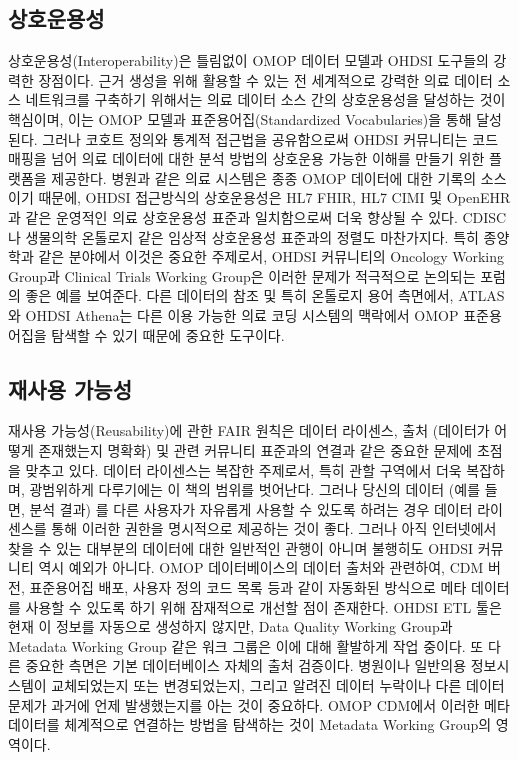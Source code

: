 \documentclass[11pt]{book}
\theoremstyle{definition}
\theoremstyle{definition}
\theoremstyle{definition}
\theoremstyle{remark}
\begin{document}
\subsection{상호운용성}

상호운용성(Interoperability)은 틀림없이 OMOP 데이터 모델과 OHDSI
도구들의 강력한 장점이다. 근거 생성을 위해 활용할 수 있는 전 세계적으로
강력한 의료 데이터 소스 네트워크를 구축하기 위해서는 의료 데이터 소스
간의 상호운용성을 달성하는 것이 핵심이며, 이는 OMOP 모델과
표준용어집(Standardized Vocabularies)을 통해 달성된다. 그러나 코호트
정의와 통계적 접근법을 공유함으로써 OHDSI 커뮤니티는 코드 매핑을 넘어
의료 데이터에 대한 분석 방법의 상호운용 가능한 이해를 만들기 위한
플랫폼을 제공한다. 병원과 같은 의료 시스템은 종종 OMOP 데이터에 대한
기록의 소스이기 때문에, OHDSI 접근방식의 상호운용성은 HL7 FHIR, HL7 CIMI
및 OpenEHR과 같은 운영적인 의료 상호운용성 표준과 일치함으로써 더욱
향상될 수 있다. CDISC나 생물의학 온톨로지 같은 임상적 상호운용성
표준과의 정렬도 마찬가지다. 특히 종양학과 같은 분야에서 이것은 중요한
주제로서, OHDSI 커뮤니티의 Oncology Working Group과 Clinical Trials
Working Group은 이러한 문제가 적극적으로 논의되는 포럼의 좋은 예를
보여준다. 다른 데이터의 참조 및 특히 온톨로지 용어 측면에서, ATLAS와
OHDSI Athena는 다른 이용 가능한 의료 코딩 시스템의 맥락에서 OMOP
표준용어집을 탐색할 수 있기 때문에 중요한 도구이다.

\subsection{재사용 가능성}\label{-}

재사용 가능성(Reusability)에 관한 FAIR 원칙은 데이터 라이센스, 출처
(데이터가 어떻게 존재했는지 명확화) 및 관련 커뮤니티 표준과의 연결과
같은 중요한 문제에 초점을 맞추고 있다. 데이터 라이센스는 복잡한
주제로서, 특히 관할 구역에서 더욱 복잡하며, 광범위하게 다루기에는 이
책의 범위를 벗어난다. 그러나 당신의 데이터 (예를 들면, 분석 결과) 를
다른 사용자가 자유롭게 사용할 수 있도록 하려는 경우 데이터 라이센스를
통해 이러한 권한을 명시적으로 제공하는 것이 좋다. 그러나 아직 인터넷에서
찾을 수 있는 대부분의 데이터에 대한 일반적인 관행이 아니며 불행히도
OHDSI 커뮤니티 역시 예외가 아니다. OMOP 데이터베이스의 데이터 출처와
관련하여, CDM 버전, 표준용어집 배포, 사용자 정의 코드 목록 등과 같이
자동화된 방식으로 메타 데이터를 사용할 수 있도록 하기 위해 잠재적으로
개선할 점이 존재한다. OHDSI ETL 툴은 현재 이 정보를 자동으로 생성하지
않지만, Data Quality Working Group과 Metadata Working Group 같은 워크
그룹은 이에 대해 활발하게 작업 중이다. 또 다른 중요한 측면은 기본
데이터베이스 자체의 출처 검증이다. 병원이나 일반의용 정보시스템이
교체되었는지 또는 변경되었는지, 그리고 알려진 데이터 누락이나 다른
데이터 문제가 과거에 언제 발생했는지를 아는 것이 중요하다. OMOP CDM에서
이러한 메타데이터를 체계적으로 연결하는 방법을 탐색하는 것이 Metadata
Working Group의 영역이다.
\end{document}
